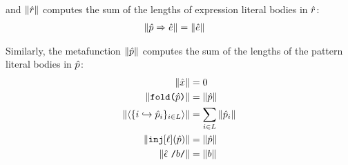 and $\Vert \hat{r} \Vert$ computes the sum of the lengths of expression literal bodies in $\hat{r}$:
\begin{align*}
\Vert \hat{p} \Rightarrow {\hat e} \Vert & = \Vert {\hat e} \Vert
\end{align*}

Similarly, the metafunction $\Vert \hat{p} \Vert$ computes the sum of the lengths of the pattern literal bodies in $\hat{p}$:
\begin{align*}
\Vert {\hat x} \Vert & = 0\\
\Vert \texttt{fold}\texttt{(}\hat{p}\texttt{)} \Vert & = \Vert \hat{p} \Vert\\
\Vert \langle \{i \hookrightarrow \hat{p}_{i}\}_{i \in L} \rangle \Vert & = \sum_{i \in L} \Vert \hat{p}_i \Vert\\
\Vert \texttt{inj}[\ell](\hat{p}) \Vert & = \Vert \hat{p} \Vert\\
\Vert {\hat\epsilon}~\texttt{/}b\texttt{/} \Vert & = \Vert b \Vert
\end{align*}

